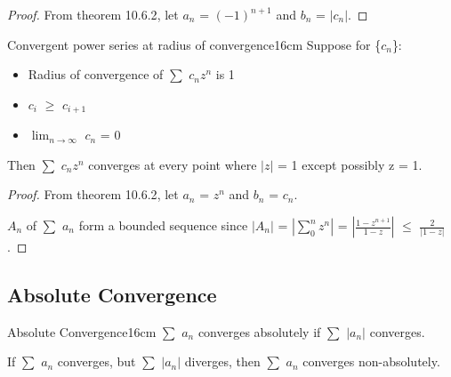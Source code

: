     \begin{proof}
        From {\color{red} theorem 10.6.2}, let
        $a_n$ = $(-1)^{n+1}$ and $b_n$ = $|c_n|$.
    \end{proof}

    \vspace{0.5cm}



    \begin{corollary}{Convergent power series at radius of convergence}{16cm}
        Suppose for \{$c_n$\}:

        \begin{itemize}[leftmargin=1cm, itemsep=0.1cm]
            \item Radius of convergence of $\sum$ $c_n z^n$ is 1
            
            \item $c_i$ $\geq$ $c_{i+1}$
            
            \item $\lim_{n \rightarrow \infty}$ $c_n$ = 0
        \end{itemize}

        Then $\sum$ $c_n z^n$ converges at every point where $|z|$ = 1
        except possibly z = 1.
    \end{corollary}

    \begin{proof}
        From {\color{red} theorem 10.6.2}, let
        $a_n$ = $z^n$ and $b_n$ = $c_n$.

        $A_n$ of $\sum$ $a_n$ form a bounded sequence since
        $| A_n |$
        = $| \sum_0^n z^n |$
        = $| \frac{1 - z^{n+1}}{1 - z} |$
        $\leq$ $\frac{2}{|1 - z|}$.        
    \end{proof}

    \vspace{0.5cm}





\subsection{ Absolute Convergence }

    \begin{definition}{Absolute Convergence}{16cm}
        $\sum$ $a_n$ {\color{lblue} converges absolutely}
        if $\sum$ $|a_n|$ converges.

        If $\sum$ $a_n$ converges, but $\sum$ $|a_n|$ diverges,
        then $\sum$ $a_n$ converges non-absolutely.
    \end{definition}

